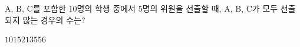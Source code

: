 \hspace*{2mm}\begin{minipage}[t]{\dimexpr\linewidth-2mm\relax}\vspace{0pt}
$\mathrm{A}$, $\mathrm{B}$, $\mathrm{C}$를 포함한 $10$명의 학생 중에서 $5$명의 위원을 선출할 때, $\mathrm{A}$, $\mathrm{B}$, $\mathrm{C}$가 모두 선출되지 않는 경우의 수는?
\begin{choices32}{$10$}{$15$}{$21$}{$35$}{$56$}\end{choices32}\end{minipage}
